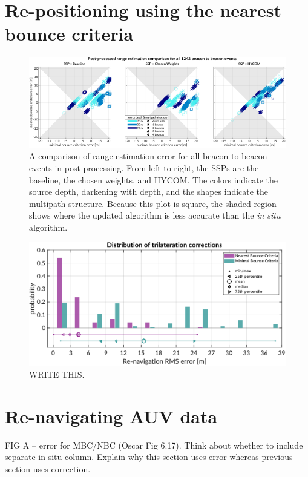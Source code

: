 \section{Re-positioning using the nearest bounce criteria}

\begin{figure}[h!]
\includegraphics[width=\textwidth]{figs/Fig7.pdf}
\caption{\label{fig:compareV1V2}{A comparison of range estimation error for all beacon to beacon events in post-processing. From left to right, the SSPs are the baseline, the chosen weights, and HYCOM. The colors indicate the source depth, darkening with depth, and the shapes indicate the multipath structure. Because this plot is square, the shaded region shows where the updated algorithm is less accurate than the \textit{in situ} algorithm.}}
\end{figure}

\begin{figure}[!ht]
\includegraphics[width=\textwidth]{figs/trilat-stat.pdf}
\caption{WRITE THIS.}
\label{fig:trilat}
\end{figure}

\clearpage
\section{Re-navigating AUV data}

FIG A -- error for MBC/NBC (Oscar Fig 6.17). Think about whether to include separate in situ column. Explain why this section uses error whereas previous section uses correction.

